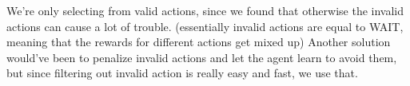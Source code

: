 
We're only selecting from valid actions, since we found that otherwise the invalid actions can cause a lot of trouble. (essentially invalid actions are equal to WAIT, meaning that the rewards for different actions get mixed up)
Another solution would've been to penalize invalid actions and let the agent learn to avoid them, but since filtering out invalid action is really easy and fast, we use that.
